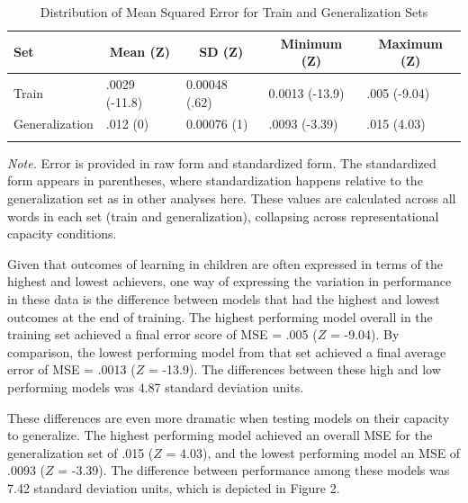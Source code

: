\documentclass[
  ,man,floatsintext]{apa6}
\begin{document}
\begin{table}[tbp]

\begin{center}
\begin{threeparttable}

\caption{\label{tab:table3}Distribution of Mean Squared Error for Train and Generalization Sets}

\begin{tabular}{lllll}
\toprule
Set & \multicolumn{1}{c}{Mean (Z)} & \multicolumn{1}{c}{SD (Z)} & \multicolumn{1}{c}{Minimum (Z)} & \multicolumn{1}{c}{Maximum (Z)}\\
\midrule
Train & .0029 (-11.8) & 0.00048 (.62) & 0.0013 (-13.9) & .005 (-9.04)\\
Generalization & .012 (0) & 0.00076 (1) & .0093 (-3.39) & .015 (4.03)\\
\bottomrule
\addlinespace
\end{tabular}

\begin{tablenotes}[para]
\normalsize{\textit{Note.} Error is provided in raw form and standardized form. The standardized form appears in parentheses, where standardization happens relative to the generalization set as in other analyses here. These values are calculated across all words in each set (train and generalization), collapsing across representational capacity conditions.}
\end{tablenotes}

\end{threeparttable}
\end{center}

\end{table}

Given that outcomes of learning in children are often expressed in terms of the highest and lowest achievers, one way of expressing the variation in performance in these data is the difference between models that had the highest and lowest outcomes at the end of training. The highest performing model overall in the training set achieved a final error score of MSE = .005 (\(Z\) = -9.04). By comparison, the lowest performing model from that set achieved a final average error of MSE = .0013 (\(Z\) = -13.9). The differences between these high and low performing models was 4.87 standard deviation units.

These differences are even more dramatic when testing models on their capacity to generalize. The highest performing model achieved an overall MSE for the generalization set of .015 (\(Z\) = 4.03), and the lowest performing model an MSE of .0093 (\(Z\) = -3.39). The difference between performance among these models was 7.42 standard deviation units, which is depicted in Figure 2.
\end{document}
